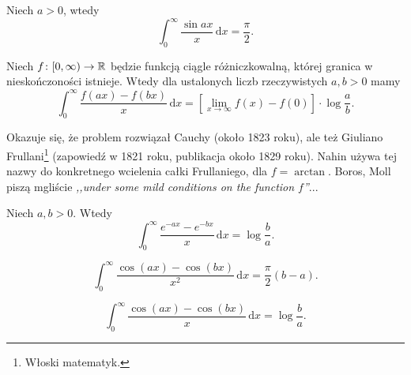 \begin{problem}
    Niech $a > 0$, wtedy
    \begin{equation}
        \int_0^\infty \frac{\sin ax}{x} \,\mathrm{d}x = \frac \pi 2.
    \end{equation}
\end{problem}


\begin{problem}
%
    Niech $f \colon [0, \infty) \to {\mathbb R}$ będzie funkcją ciągle różniczkowalną, której granica w nieskończoności istnieje.
    Wtedy dla ustalonych liczb rzeczywistych $a, b > 0$ mamy
    \begin{equation}
        \int_0^\infty \frac{f(ax) - f(bx)}{x} \,\mathrm{d} x = \left[\lim_{x \to \infty} f(x) - f(0) \right] \cdot \log \frac a b.
    \end{equation}
\end{problem}

Okazuje się, że problem rozwiązał Cauchy (około 1823 roku), ale też Giuliano Frullani\footnote{Włoski matematyk.} (zapowiedź w 1821 roku, publikacja około 1829 roku).
%
Nahin \cite[s. 85]{nahin15} używa tej nazwy do konkretnego wcielenia całki Frullaniego, dla $f = \arctan$.
Boros, Moll \cite[s. 98]{boros04} piszą mgliście \emph{,,under some mild conditions on the function $f$''}...

\begin{problem}
    Niech $a, b > 0$.
    Wtedy
    \begin{equation}
        \int_0^\infty \frac{e^{-ax} - e^{-bx}}{x} \,\mathrm{d}x = \log \frac b a.
    \end{equation}
\end{problem}

\begin{problem}
    \begin{equation}
        \int_0^\infty \frac{\cos (ax) - \cos (bx)}{x^2} \,\mathrm{d}x = \frac \pi 2 (b - a).
    \end{equation}
\end{problem}

\begin{problem}
    \begin{equation}
        \int_0^\infty \frac{\cos (ax) - \cos (bx)}{x} \,\mathrm{d}x = \log \frac b a.
    \end{equation}
\end{problem}

